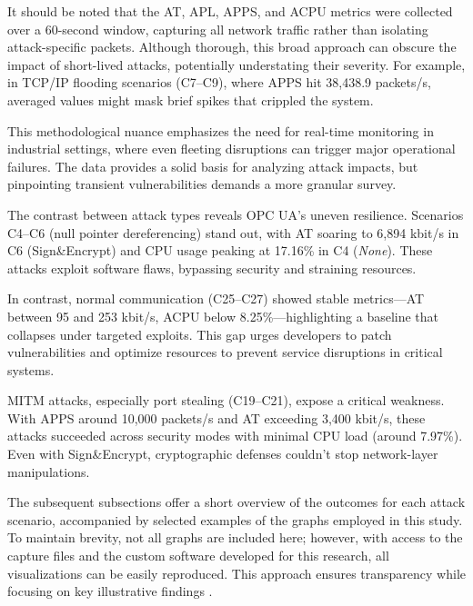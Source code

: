 \documentclass[pdflatex,sn-mathphys-num,iicol]{sn-jnl}%
\makeatletter
\newcommand\footnoteref[1]{\protected@xdef\@thefnmark{\ref{#1}}\@footnotemark}
\makeatother
\begin{document}
It should be noted that the AT, APL, APPS, and ACPU metrics were collected over a 60-second window, capturing all network traffic rather than isolating attack-specific packets. Although thorough, this broad approach can obscure the impact of short-lived attacks, potentially understating their severity. For example, in TCP/IP flooding scenarios (C7–C9), where APPS hit 38,438.9 packets/s, averaged values might mask brief spikes that crippled the system.

This methodological nuance emphasizes the need for real-time monitoring in industrial settings, where even fleeting disruptions can trigger major operational failures. The data provides a solid basis for analyzing attack impacts, but pinpointing transient vulnerabilities demands a more granular survey.

The contrast between attack types reveals OPC UA's uneven resilience. Scenarios C4–C6 (null pointer dereferencing) stand out, with AT soaring to 6,894 kbit/s in C6 (Sign\&Encrypt) and CPU usage peaking at 17.16\% in C4 (\textit{None}). These attacks exploit software flaws, bypassing security and straining resources.

In contrast, normal communication (C25–C27) showed stable metrics—AT between 95 and 253 kbit/s, ACPU below 8.25\%—highlighting a baseline that collapses under targeted exploits. This gap urges developers to patch vulnerabilities and optimize resources to prevent service disruptions in critical systems.

MITM attacks, especially port stealing (C19–C21), expose a critical weakness. With APPS around 10,000 packets/s and AT exceeding 3,400 kbit/s, these attacks succeeded across security modes with minimal CPU load (around 7.97\%). Even with Sign\&Encrypt, cryptographic defenses couldn’t stop network-layer manipulations.


The subsequent subsections offer a short overview of the outcomes for each attack scenario, accompanied by selected examples of the graphs employed in this study. To maintain brevity, not all graphs are included here; however, with access to the capture files and the custom software developed for this research, all visualizations can be easily reproduced. This approach ensures transparency while focusing on key illustrative findings \footnoteref{github_note}.
\end{document}
